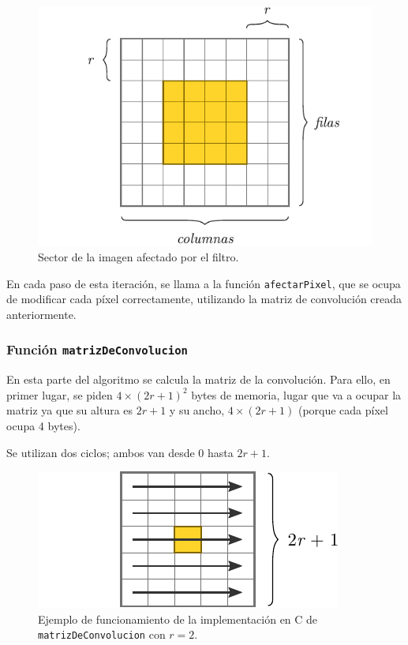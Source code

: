         \begin{figure}[h]
          \centering \includegraphics{imagenes/zona-afectada.pdf}
          \caption{Sector de la imagen afectado por el filtro.} \label{fig:zona-afectada}
        \end{figure}

      En cada paso de esta iteración, se llama a la función \texttt{afectarPixel}, que se ocupa de modificar cada píxel correctamente, utilizando la matriz de convolución creada anteriormente. 

      \subsubsection*{Función \texttt{matrizDeConvolucion}}

        En esta parte del algoritmo se calcula la matriz de la convolución. Para ello, en primer lugar, se piden $4 \times (2r + 1)^2$ bytes de memoria, lugar que va a ocupar la matriz ya que su altura es $2r + 1$ y su ancho, $4 \times (2r + 1)$ (porque cada píxel ocupa 4 bytes).
        
        Se utilizan dos ciclos; ambos van desde $0$ hasta $2r + 1$. 
        
        \begin{figure}[h]
          \centering \includegraphics{imagenes/matriz-de-convolucion-c.pdf}
          \caption{Ejemplo de funcionamiento de la implementación en C de \texttt{matrizDeConvolucion} con $r = 2$.} \label{fig:matriz-de-convolucion-c}
        \end{figure}

